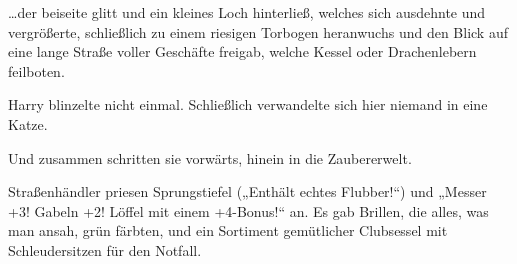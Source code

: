 …der beiseite glitt und ein kleines Loch hinterließ, welches sich ausdehnte und vergrößerte, schließlich zu einem riesigen Torbogen heranwuchs und den Blick auf eine lange Straße voller Geschäfte freigab, welche Kessel oder Drachenlebern feilboten.

Harry blinzelte nicht einmal. Schließlich verwandelte sich hier niemand in eine Katze.

Und zusammen schritten sie vorwärts, hinein in die Zaubererwelt.

Straßenhändler priesen Sprungstiefel („Enthält echtes Flubber!“) und
„Messer +3! Gabeln +2! Löffel mit einem +4-Bonus!“ an. Es gab Brillen, die alles, was man ansah, grün färbten, und ein Sortiment gemütlicher Clubsessel mit Schleudersitzen für den Notfall.

